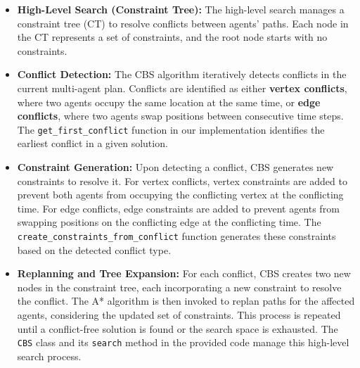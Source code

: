 \begin{itemize}
    \item \textbf{High-Level Search (Constraint Tree):} The high-level search manages a constraint tree (CT) to resolve conflicts between agents' paths. Each node in the CT represents a set of constraints, and the root node starts with no constraints.
    \item \textbf{Conflict Detection:} The CBS algorithm iteratively detects conflicts in the current multi-agent plan. Conflicts are identified as either \textbf{vertex conflicts}, where two agents occupy the same location at the same time, or \textbf{edge conflicts}, where two agents swap positions between consecutive time steps. The \texttt{get\_first\_conflict} function in our implementation identifies the earliest conflict in a given solution.
    \item \textbf{Constraint Generation:} Upon detecting a conflict, CBS generates new constraints to resolve it. For vertex conflicts, vertex constraints are added to prevent both agents from occupying the conflicting vertex at the conflicting time. For edge conflicts, edge constraints are added to prevent agents from swapping positions on the conflicting edge at the conflicting time. The \texttt{create\_constraints\_from\_conflict} function generates these constraints based on the detected conflict type.
    \item \textbf{Replanning and Tree Expansion:} For each conflict, CBS creates two new nodes in the constraint tree, each incorporating a new constraint to resolve the conflict. The A* algorithm is then invoked to replan paths for the affected agents, considering the updated set of constraints. This process is repeated until a conflict-free solution is found or the search space is exhausted. The \texttt{CBS} class and its \texttt{search} method in the provided code manage this high-level search process.
\end{itemize}

